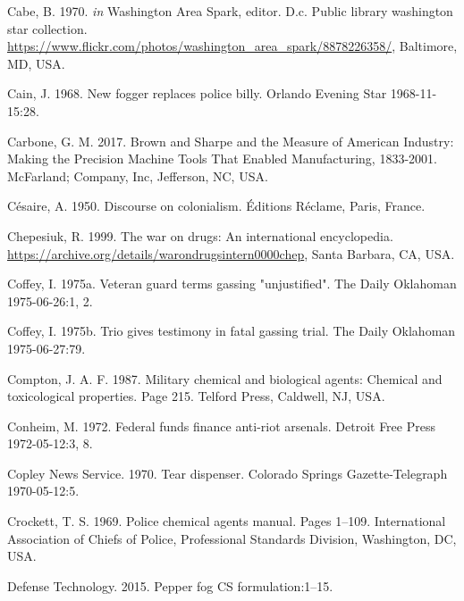 \documentclass[
  11pt,
]{krantz}
\newlength{\cslhangindent}
\newlength{\cslentryspacingunit} %
\newenvironment{CSLReferences}[2] %
 {%
  \setlength{\parindent}{0pt}
  \ifodd #1
  \let\oldpar\par
  \def\par{\hangindent=\cslhangindent\oldpar}
  \fi
  \setlength{\parskip}{#2\cslentryspacingunit}
 }%
 {}
\begin{document}
\begin{CSLReferences}{1}{0}
\leavevmode{}%
Cabe, B. 1970. \emph{in} Washington Area Spark, editor. D.c. Public library washington star collection. \url{https://www.flickr.com/photos/washington_area_spark/8878226358/}, Baltimore, MD, USA.

\leavevmode{}%
Cain, J. 1968. New fogger replaces police billy. Orlando Evening Star 1968-11-15:28.

\leavevmode{}%
Carbone, G. M. 2017. {Brown and Sharpe and the Measure of American Industry: Making the Precision Machine Tools That Enabled Manufacturing, 1833-2001}. McFarland; Company, Inc, Jefferson, NC, USA.

\leavevmode{}%
Césaire, A. 1950. Discourse on colonialism. Éditions Réclame, Paris, France.

\leavevmode{}%
Chepesiuk, R. 1999. The war on drugs: An international encyclopedia. \url{https://archive.org/details/warondrugsintern0000chep}, Santa Barbara, CA, USA.

\leavevmode{}%
Coffey, I. 1975a. Veteran guard terms gassing "unjustified". The Daily Oklahoman 1975-06-26:1, 2.

\leavevmode{}%
Coffey, I. 1975b. Trio gives testimony in fatal gassing trial. The Daily Oklahoman 1975-06-27:79.

\leavevmode{}%
Compton, J. A. F. 1987. Military chemical and biological agents: Chemical and toxicological properties. Page 215. Telford Press, Caldwell, NJ, USA.

\leavevmode{}%
Conheim, M. 1972. Federal funds finance anti-riot arsenals. Detroit Free Press 1972-05-12:3, 8.

\leavevmode{}%
Copley News Service. 1970. Tear dispenser. Colorado Springs Gazette-Telegraph 1970-05-12:5.

\leavevmode{}%
Crockett, T. S. 1969. Police chemical agents manual. Pages 1--109. International Association of Chiefs of Police, Professional Standards Division, Washington, DC, USA.

\leavevmode{}%
Defense Technology. 2015. Pepper fog CS formulation:1--15.


\end{CSLReferences}
\end{document}

